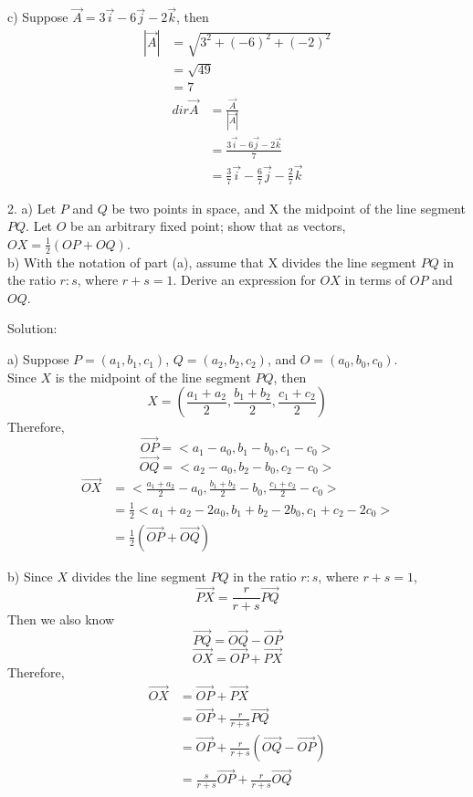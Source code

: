 \documentclass{article}
\begin{document}
c) Suppose $\vec{A} = 3\vec{i} - 6\vec{j} - 2\vec{k}$, then
\[
  \begin{split}
    |\vec{A}| &= \sqrt{3^2 + (-6)^2 + (-2)^2} \\
              &= \sqrt{49} \\
              &= 7
  \end{split}
\]
\[
  \begin{split}
    dir \vec{A} &= \frac{\vec{A}}{|\vec{A}|} \\
                &= \frac{3\vec{i} - 6\vec{j} - 2\vec{k}}{7} \\
                &= \frac{3}{7}\vec{i} - \frac{6}{7}\vec{j} - \frac{2}{7}\vec{k}
  \end{split}
\]

2. a) Let $P$ and $Q$ be two points in space, and X the midpoint of the line
segment $PQ$. Let $O$ be an arbitrary fixed point; show that as vectors, $OX =
\frac{1}{2}(OP + OQ)$.\\
b) With the notation of part (a), assume that X divides the line segment $PQ$
in the ratio $r:s$, where $r + s = 1$. Derive an expression for $OX$ in terms
of $OP$ and $OQ$.

Solution:

a) Suppose $P = (a_1, b_1, c_1)$, $Q = (a_2, b_2, c_2)$, and $O = (a_0, b_0, c_0)$.\\
Since $X$ is the midpoint of the line segment $PQ$, then
\[
    X = (\frac{a_1 + a_2}{2}, \frac{b_1 + b_2}{2}, \frac{c_1 + c_2}{2})
\]
Therefore,
\[
  \vec{OP} = <a_1 - a_0, b_1 - b_0, c_1 - c_0>
\]
\[
  \vec{OQ} = <a_2 - a_0, b_2 - b_0, c_2 - c_0>
\]
\[
  \begin{split}
    \vec{OX} &= <\frac{a_1 + a_2}{2} - a_0, \frac{b_1 + b_2}{2} - b_0, \frac{c_1 + c_2}{2} - c_0> \\
             &= \frac{1}{2}<a_1 + a_2 - 2a_0, b_1 + b_2 - 2b_0, c_1 + c_2 - 2c_0> \\
             &= \frac{1}{2}(\vec{OP} + \vec{OQ})
  \end{split}
\]

b) Since $X$ divides the line segment $PQ$ in the ratio $r : s$, where
$r + s = 1$,
\[
  \vec{PX} = \frac{r}{r + s}\vec{PQ}
\]
Then we also know
\[
  \vec{PQ} = \vec{OQ} - \vec{OP}
\]
\[
  \vec{OX} = \vec{OP} + \vec{PX}
\]
Therefore,
\[
  \begin{split}
    \vec{OX} &= \vec{OP} + \vec{PX} \\
             &= \vec{OP} + \frac{r}{r + s}\vec{PQ} \\
             &= \vec{OP} + \frac{r}{r + s}(\vec{OQ} - \vec{OP}) \\
             &= \frac{s}{r + s}\vec{OP} + \frac{r}{r + s}\vec{OQ} \\
  \end{split}
\]
\end{document}
